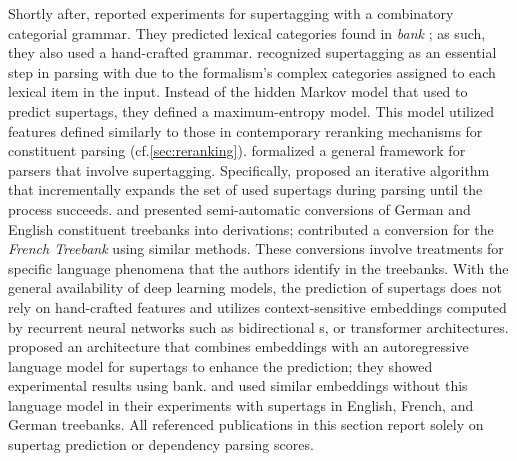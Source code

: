 \documentclass[../document.tex]{subfiles}
\begin{document}
    Shortly after, \citet{clark2002supertagging} reported experiments for supertagging with a combinatory categorial grammar.
    They predicted lexical categories found in \emph{bank} \citep{Hoc07}; as such, they also used a hand-crafted grammar.
     recognized supertagging as an essential step in parsing with  due to the formalism's complex categories assigned to each lexical item in the input.
    Instead of the hidden Markov model that \citeauthor{bangalore1999supertagging} used to predict supertags, they defined a maximum-entropy model.
    This model utilized features defined similarly to those in contemporary reranking mechanisms for constituent parsing (cf.\@ \cref{sec:reranking}).
     formalized a general framework for parsers that involve supertagging.
    Specifically, \citeauthor{Auli12} proposed an iterative algorithm that incrementally expands the set of used supertags during parsing until the process succeeds.
     and \citet{Kaeshammer2012GermanAE} presented semi-automatic conversions of German and English constituent treebanks into  derivations; \citet{Bla18} contributed a conversion for the \emph{French Treebank} \citep{abeille2003building} using similar methods.
    These conversions involve treatments for specific language phenomena that the authors identify in the treebanks.
    With the general availability of deep learning models, the prediction of supertags does not rely on hand-crafted features and utilizes context-sensitive embeddings computed by recurrent neural networks such as bidirectional s, or transformer architectures.
     proposed an architecture that combines  embeddings with an autoregressive language model for supertags to enhance the prediction; they showed experimental results using bank.
     and \citet{Bla18} used similar embeddings without this language model in their experiments with  supertags in English, French, and German treebanks.
    All referenced publications in this section report solely on supertag prediction or dependency parsing scores.

\end{document}
